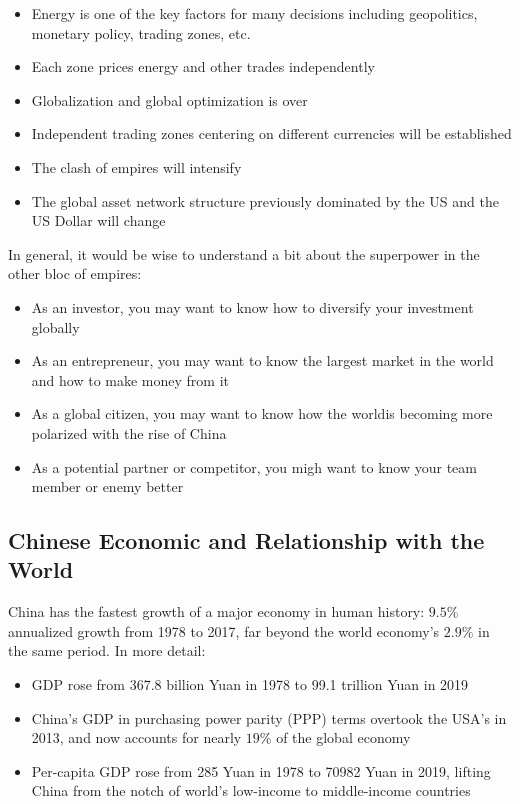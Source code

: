 \documentclass[a4paper]{extarticle}
\begin{document}
\begin{itemize}
    \item Energy is one of the key factors for many decisions including geopolitics, monetary policy, trading zones, etc.
    \item Each zone prices energy and other trades independently
    \item Globalization and global optimization is over
    \item Independent trading zones centering on different currencies will be established
    \item The clash of empires will intensify
    \item The global asset network structure previously dominated by the US and the US Dollar will change
\end{itemize}

In general, it would be wise to understand a bit about the superpower in the other bloc of empires:

\begin{itemize}
    \item As an investor, you may want to know how to diversify your investment globally
    \item As an entrepreneur, you may want to know the largest market in the world and how to make money from it
    \item As a global citizen, you may want to know how the worldis becoming more polarized with the rise of China
    \item As a potential partner or competitor, you migh want to know your team member or enemy better
\end{itemize}

\subsection{Chinese Economic and Relationship with the World}

China has the fastest growth of a major economy in human history: $9.5\%$ annualized growth from 1978 to 2017, far beyond the world economy's $2.9\%$ in the same period. In more detail:

\begin{itemize}
    \item GDP rose from 367.8 billion Yuan in 1978 to 99.1 trillion Yuan in 2019
    \item China's GDP in purchasing power parity (PPP) terms overtook the USA's in 2013, and now accounts for nearly $19\%$ of the global economy
    \item Per-capita GDP rose from 285 Yuan in 1978 to 70982 Yuan in 2019, lifting China from the notch of world's low-income to middle-income countries
\end{itemize}
\end{document}
